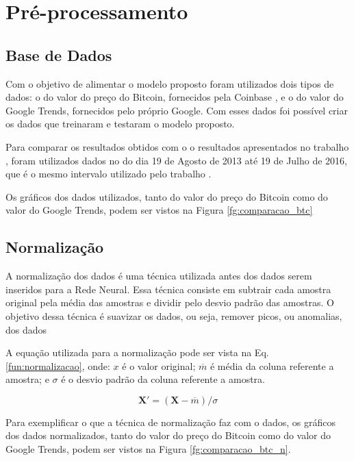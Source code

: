 \section{Pré-processamento}

\subsection{Base de Dados}
\label{subsec:base_de_dados}
 Com o objetivo de alimentar o modelo proposto foram utilizados dois tipos de dados: o do valor do preço do Bitcoin, fornecidos pela Coinbase \cite{Coinbase}, e o do valor do Google Trends, fornecidos pelo próprio Google. Com esses dados foi possível criar os dados que treinaram e testaram o modelo proposto.
 
Para comparar os resultados obtidos com o o resultados apresentados no trabalho \cite{wilson_yelowitz_2014}, foram utilizados dados no do dia 19 de Agosto de 2013 até 19 de Julho de 2016, que é o mesmo intervalo utilizado pelo trabalho \cite{wilson_yelowitz_2014}.
 
 Os gráficos dos dados utilizados, tanto do valor do preço do Bitcoin como do valor do Google Trends, podem ser vistos na Figura \ref{fg:comparacao_btc}
 
 \subsection{Normalização}
 \label{subsec:normalizacao}
A normalização dos dados é uma técnica utilizada antes dos dados serem inseridos para a Rede Neural. Essa técnica consiste em subtrair cada amostra original pela média das amostras e dividir pelo desvio padrão das amostras. O objetivo dessa técnica é suavizar os dados, ou seja, remover picos, ou anomalias, dos dados \cite{quackenbush2002microarray}

A equação utilizada para a normalização pode ser vista na Eq. \ref{fun:normalizacao}, onde: $x$ é o valor original; $\overline{m}$ é média da coluna referente a amostra; e $\sigma$ é o desvio padrão da coluna referente a amostra.

\begin{equation}
    \label{fun:normalizacao}
 \mathbf{X'} = (\mathbf{X}-\overline{m})/\sigma
\end{equation}

Para exemplificar o que a técnica de normalização faz com o dados, os gráficos dos dados normalizados, tanto do valor do preço do Bitcoin como do valor do Google Trends, podem ser vistos na Figura \ref{fg:comparacao_btc_n}.


